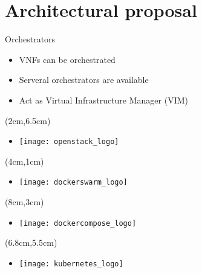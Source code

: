 \section{Architectural proposal}
\begin{frame}{Orchestrators}
  \begin{itemize}
  \item<1-> VNFs can be orchestrated
  \item<2-> Serveral orchestrators are available
  \item<7-> Act as Virtual Infrastructure Manager (VIM)
  \end{itemize}

  \begin{textblock*}{5cm}(2cm,6.5cm)
    \begin{itemize}
    \item[]<3-> \texttt{[image: openstack\_logo]}
    \end{itemize}
  \end{textblock*}

  \begin{textblock*}{5cm}(4cm,1cm)
    \begin{itemize}
    \item[]<4-> \texttt{[image: dockerswarm\_logo]}
    \end{itemize}
  \end{textblock*}

  \begin{textblock*}{5cm}(8cm,3cm)
    \begin{itemize}
    \item[]<5-> \texttt{[image: dockercompose\_logo]}
    \end{itemize}
  \end{textblock*}

  \begin{textblock*}{5cm}(6.8cm,5.5cm)
    \begin{itemize}
    \item[]<6-> \texttt{[image: kubernetes\_logo]}
    \end{itemize}
  \end{textblock*}
\end{frame}

